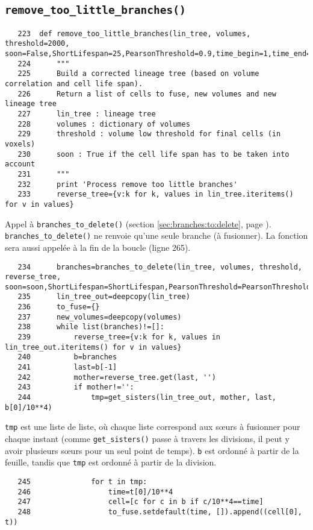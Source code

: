 \documentclass{article}
\def \mycolor {red}
\begin{document}
\subsection{\texttt{remove\_too\_little\_branches()}}
\label{sec:remove:too:little:branches}
\begin{verbatim} 
   223	def remove_too_little_branches(lin_tree, volumes, threshold=2000, soon=False,ShortLifespan=25,PearsonThreshold=0.9,time_begin=1,time_end=192):
   224	    """
   225	    Build a corrected lineage tree (based on volume correlation and cell life span).
   226	    Return a list of cells to fuse, new volumes and new lineage tree
   227	    lin_tree : lineage tree
   228	    volumes : dictionary of volumes
   229	    threshold : volume low threshold for final cells (in voxels)
   230	    soon : True if the cell life span has to be taken into account
   231	    """
   232	    print 'Process remove too little branches'
   233	    reverse_tree={v:k for k, values in lin_tree.iteritems() for v in values}
\end{verbatim} 
\color{\mycolor}
Appel \`a \texttt{branches\_to\_delete()}
(section \ref{sec:branches:to:delete}, page \pageref{sec:branches:to:delete}). \texttt{branches\_to\_delete()} ne renvoie qu'une seule branche (\`a fusionner). La fonction sera aussi appel\'ee \`a la fin de la boucle (ligne 265).
\color{black}
\begin{verbatim}
   234	    branches=branches_to_delete(lin_tree, volumes, threshold, reverse_tree, soon=soon,ShortLifespan=ShortLifespan,PearsonThreshold=PearsonThreshold,time_begin=time_begin,time_end=time_end)
   235	    lin_tree_out=deepcopy(lin_tree)
   236	    to_fuse={}
   237	    new_volumes=deepcopy(volumes)
   238	    while list(branches)!=[]:
   239	        reverse_tree={v:k for k, values in lin_tree_out.iteritems() for v in values}
   240	        b=branches
   241	        last=b[-1]
   242	        mother=reverse_tree.get(last, '')
   243	        if mother!='':
   244	            tmp=get_sisters(lin_tree_out, mother, last, b[0]/10**4)
\end{verbatim} 
\color{\mycolor}
\verb|tmp| est une liste de liste, o\`u chaque liste correspond aux s{\oe}urs \`a fusionner pour chaque instant (comme \verb|get_sisters()| passe \`a travers les divisions, il peut y avoir plusieurs s{\oe}urs pour un seul point de temps). \verb|b| est ordonn\'e \`a partir de la feuille, tandis que \verb|tmp| est ordonn\'e \`a partir de la division.
\color{black}
\begin{verbatim}
   245	            for t in tmp:
   246	                time=t[0]/10**4
   247	                cell=[c for c in b if c/10**4==time]
   248	                to_fuse.setdefault(time, []).append((cell[0], t))
\end{verbatim} 
\end{document}
